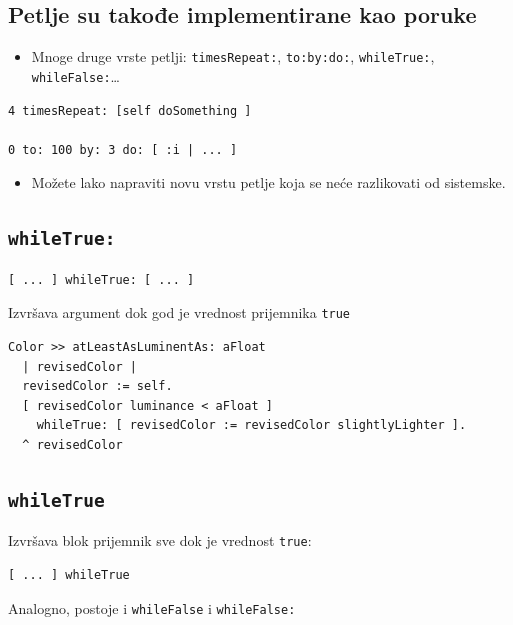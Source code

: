 \documentclass[presentation]{beamer}
\begin{document}
\subsection{Petlje su takođe implementirane kao poruke}
\label{sec:org3160ce4}

\begin{itemize}
\item Mnoge druge vrste petlji: \texttt{timesRepeat:}, \texttt{to:by:do:}, \texttt{whileTrue:},
\texttt{whileFalse:}\ldots{}
\end{itemize}

\begin{verbatim}
4 timesRepeat: [self doSomething ]

0 to: 100 by: 3 do: [ :i | ... ]
\end{verbatim}

\begin{itemize}
\item Možete lako napraviti novu vrstu petlje koja se neće razlikovati od sistemske.
\end{itemize}

\subsection{\texttt{whileTrue:}}
\label{sec:orgfb0cabd}

\begin{verbatim}
[ ... ] whileTrue: [ ... ]
\end{verbatim}

Izvršava argument dok god je vrednost prijemnika \texttt{true}

\begin{verbatim}
Color >> atLeastAsLuminentAs: aFloat
  | revisedColor |
  revisedColor := self.
  [ revisedColor luminance < aFloat ]
    whileTrue: [ revisedColor := revisedColor slightlyLighter ].
  ^ revisedColor
\end{verbatim}

\subsection{\texttt{whileTrue}}
\label{sec:org5815eeb}

Izvršava blok prijemnik sve dok je vrednost \texttt{true}:

\begin{verbatim}
[ ... ] whileTrue

\end{verbatim}

Analogno, postoje i \texttt{whileFalse} i \texttt{whileFalse:}
\end{document}
